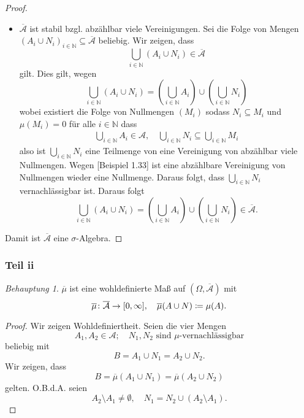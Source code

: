 \documentclass[draft,a5paper]{article}
\theoremstyle{remark}
\newtheorem*{Behauptung}{Behauptung}
\providecommand{\olA}{\overline{\mathcal{A}}}
\providecommand{\olm}{\overline{\mu}}
\begin{document}
\begin{proof}
\begin{itemize}
    Falls \(N^{c} \notin \mathcal{A}\). Weil \(N \subseteq \Omega\) eine
    \(\mu\)-vernachlässigbare Menge ist, existiert eine Menge
    \(M \in \mathcal{A}\) mit \(\mu(M) = 0\) und \(N \subseteq M\).  Daraus folgt, dass \(M^{c} \subseteq
    N^{c}\).  Dann gilt
    \[A^{c} \cap N^{c} = (A^{c} \cap M^{c}) \cup (A^{c} \cap (N^{c} \setminus M^{c})) =
      (A^{c} \cap M^{c}) \cup (A^{c} \cap (M \setminus N))\]
    indem \(A, M \in \mathcal{A}, N \subseteq M\) und \(\mu(M) = 0\) gelten.  Daraus folgt, dass
    \[(A^{c} \cap M^{c}) \in \mathcal{A}, \quad (A^{c} \cap (M \setminus N)) \subseteq M\] also ist
    \((A^{c} \cap (M \setminus N))\) vernachlässigbar.  Damit ist
    \[(A^{c} \cap M^{c}) \cup (A^{c} \cap (M \setminus N)) \in \olA\]
    und die Behauptung gilt.
  \item \(\olA\) ist stabil bzgl. abzählbar viele Vereinigungen.  Sei
    die Folge von Mengen \((A_{i} \cup N_{i})_{i \in \mathbb{N}} \subseteq \olA\) beliebig.
    Wir zeigen, dass
    \[\bigcup_{i \in \mathbb{N}}(A_{i} \cup N_{i}) \in \olA\]
    gilt.  Dies gilt, wegen
    \[\bigcup_{i\in\mathbb{N}}(A_{i} \cup N_{i}) = \left(\bigcup_{i\in\mathbb{N}}A_{i}\right) \cup
      \left(\bigcup_{i\in\mathbb{N}}N_{i}\right)\]
    wobei existiert die Folge von Nullmengen \((M_{i})\) sodass \(N_{i} \subseteq
    M_{i}\) und \(\mu(M_{i}) = 0\) für alle \(i \in \mathbb{N}\) dass
    \begin{align*}
      \bigcup_{i \in \mathbb{N}}A_{i} \in \mathcal{A} , \quad \bigcup_{i\in\mathbb{N}}N_{i} \subseteq \bigcup_{i \in \mathbb{N}}M_{i}
    \end{align*}
    also ist \(\bigcup_{i\in\mathbb{N}}N_{i}\) eine Teilmenge von eine Vereinigung von
    abzählbar viele Nullmengen. Wegen [Beispiel 1.33] ist eine
    abzählbare Vereinigung von Nullmengen wieder eine Nullmenge.
    Daraus folgt, dass \(\bigcup_{i\in\mathbb{N}}N_{i}\) vernachlässigbar ist.  Daraus
    folgt
  \[\bigcup_{i\in\mathbb{N}}(A_{i} \cup N_{i}) = \left(\bigcup_{i\in\mathbb{N}}A_{i}\right) \cup
      \left(\bigcup_{i\in\mathbb{N}}N_{i}\right) \in \olA.\]
  \end{itemize}
  Damit ist \(\olA\) eine \(\sigma\)-Algebra.
\end{proof}
\subsubsection{Teil ii}
\begin{Behauptung}
  \(\olm\) ist eine wohldefinierte Maß auf \((\Omega, \olA)\) mit
  \[\olm\colon \olA \to
  \interval{0}{\infty}, \quad \olm(A \cup N) \coloneq \mu(A).\]
\end{Behauptung}
\begin{proof}
  Wir zeigen Wohldefiniertheit.  Seien die vier Mengen
  \[A_{1}, A_{2} \in \mathcal{A}; \quad N_{1}, N_{2} \text{ sind } \mu\text{-vernachlässigbar}\]
  beliebig mit
  \[B = A_{1} \cup N_{1} = A_{2} \cup N_{2}.\]
  Wir zeigen, dass
  \[B = \olm(A_{1} \cup N_{1}) = \olm(A_{2} \cup N_{2})\]
  gelten.  O.B.d.A. seien
  \[A_{2} \setminus A_{1} \ne \emptyset, \quad N_{1} = N_{2} \cup (A_{2} \setminus A_{1}).\]
\end{proof}
\end{document}

